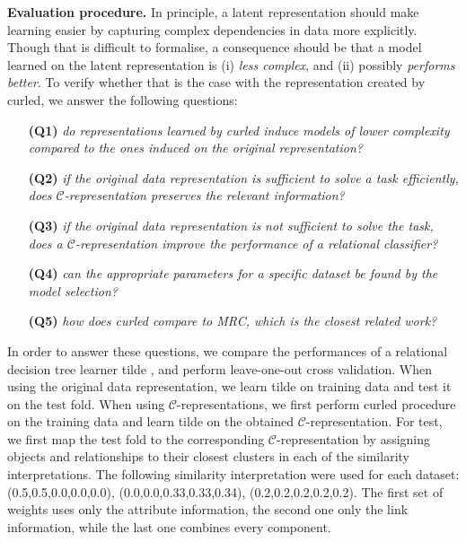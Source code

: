 \textbf{Evaluation procedure.}
In principle, a latent representation should make learning easier by capturing complex dependencies in data more explicitly.
Though that is difficult to formalise, a consequence should be that a model learned on the latent representation is (i) \textit{less complex}, and (ii) possibly \textit{performs better}.
To verify whether that is the case with the representation created by \gls{curled}, we answer the following questions:
\begin{itemize}
	\setlength\itemsep{0.06em}
    \item[\textbf{(Q1)}] \textit{do representations learned by \gls{curled} induce models of lower complexity compared to the ones induced on the original representation?}
    \item[\textbf{(Q2)}] \textit{if the original data representation is sufficient to solve a task efficiently, does $\mathcal{C}$-representation preserves the relevant information?}
    \item[\textbf{(Q3)}] \textit{if the original data representation is not sufficient to solve the task, does a $\mathcal{C}$-representation improve the performance of a relational classifier?}
    \item[\textbf{(Q4)}] \textit{can the appropriate parameters for a specific dataset be found by the model selection?}
    \item[\textbf{(Q5)}] \textit{how does \gls{curled} compare to MRC, which is the closest related work?}
\end{itemize}



In order to answer these questions, we compare the performances of a relational decision tree learner \gls{tilde} \cite{Blockeel1998285}, and perform leave-one-out cross validation.
When using the original data representation, we learn \gls{tilde} on training data and test it on the test fold.
When using $\mathcal{C}$-representations, we first perform \gls{curled} procedure on the training data and learn \gls{tilde} on the obtained $\mathcal{C}$-representation.
For test, we first map the test fold to the corresponding $\mathcal{C}$-representation by assigning objects and relationships to their closest clusters in each of the similarity interpretations.
The following similarity interpretation were used for each dataset: (0.5,0.5,0.0,0.0,0.0), (0.0,0.0,0.33,0.33,0.34), (0.2,0.2,0.2,0.2,0.2).
The first set of weights uses only the attribute information, the second one only the link information, while the last one combines every component.



